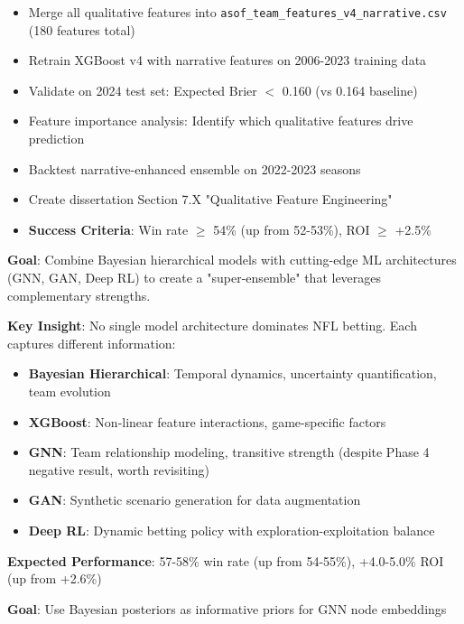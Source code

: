 \begin{itemize}
  \item {} Merge all qualitative features into \texttt{asof\_team\_features\_v4\_narrative.csv} (180 features total)
  \item {} Retrain XGBoost v4 with narrative features on 2006-2023 training data
  \item {} Validate on 2024 test set: Expected Brier $<$ 0.160 (vs 0.164 baseline)
  \item {} Feature importance analysis: Identify which qualitative features drive prediction
  \item {} Backtest narrative-enhanced ensemble on 2022-2023 seasons
  \item {} Create dissertation Section 7.X "Qualitative Feature Engineering"
  \item \textbf{Success Criteria}: Win rate $\ge$ 54\% (up from 52-53\%), ROI $\ge$ +2.5\%
\end{itemize}


\textbf{Goal}: Combine Bayesian hierarchical models with cutting-edge ML architectures (GNN, GAN, Deep RL) to create a "super-ensemble" that leverages complementary strengths.

\textbf{Key Insight}: No single model architecture dominates NFL betting. Each captures different information:
\begin{itemize}
  \item \textbf{Bayesian Hierarchical}: Temporal dynamics, uncertainty quantification, team evolution
  \item \textbf{XGBoost}: Non-linear feature interactions, game-specific factors
  \item \textbf{GNN}: Team relationship modeling, transitive strength (despite Phase 4 negative result, worth revisiting)
  \item \textbf{GAN}: Synthetic scenario generation for data augmentation
  \item \textbf{Deep RL}: Dynamic betting policy with exploration-exploitation balance
\end{itemize}

\textbf{Expected Performance}: 57-58\% win rate (up from 54-55\%), +4.0-5.0\% ROI (up from +2.6\%)

\textbf{Goal}: Use Bayesian posteriors as informative priors for GNN node embeddings

